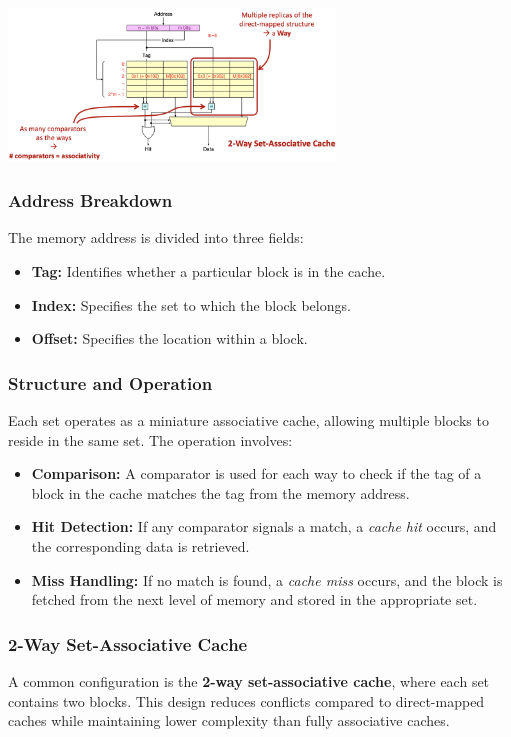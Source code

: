 \begin{center}
    \includegraphics[width=0.65\textwidth]{chapters/chapter3a/images/set.png}
\end{center}

\subsubsection*{Address Breakdown}
The memory address is divided into three fields:
\begin{itemize}
    \item \textbf{Tag:} Identifies whether a particular block is in the cache.
    \item \textbf{Index:} Specifies the set to which the block belongs.
    \item \textbf{Offset:} Specifies the location within a block.
\end{itemize}

\subsubsection*{Structure and Operation}
Each set operates as a miniature associative cache, allowing multiple blocks to reside in the same set. The operation involves:
\begin{itemize}
    \item \textbf{Comparison:} A comparator is used for each way to check if the tag of a block in the cache matches the tag from the memory address.
    \item \textbf{Hit Detection:} If any comparator signals a match, a \textit{cache hit} occurs, and the corresponding data is retrieved.
    \item \textbf{Miss Handling:} If no match is found, a \textit{cache miss} occurs, and the block is fetched from the next level of memory and stored in the appropriate set.
\end{itemize}

\subsubsection*{2-Way Set-Associative Cache}
A common configuration is the \textbf{2-way set-associative cache}, where each set contains two blocks. This design reduces conflicts compared to direct-mapped caches while maintaining lower complexity than fully associative caches.

